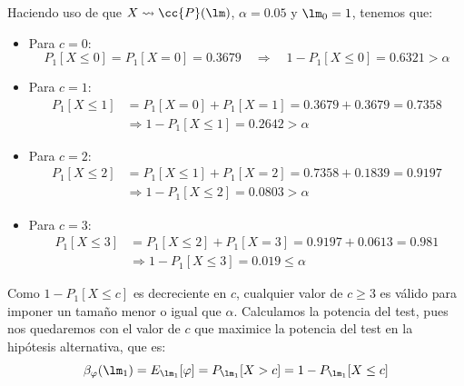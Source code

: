 \begin{ejercicio}
\begin{enumerate}[label=\alph*)]
            Haciendo uso de que $X\rightsquigarrow \cc{P}(\lm)$, $\alpha = 0.05$ y $\lm_0 = 1$, tenemos que:
            \begin{itemize}
                \item Para $c=0$:
                    \begin{equation*}
                        P_1[X\leq 0] = P_1[X = 0] = 0.3679 \quad\Longrightarrow\quad 1-P_1[X\leq 0] = 0.6321 > \alpha
                    \end{equation*}
                \item Para $c=1$:
                    \begin{align*}
                        P_1[X\leq 1] &= P_1[X=0] + P_1[X=1] = 0.3679 + 0.3679 = 0.7358  \\
                                     &\Longrightarrow 1-P_1[X\leq 1] = 0.2642 > \alpha
                    \end{align*}
                \item Para $c=2$:
                    \begin{align*}
                        P_1[X\leq 2] &= P_1[X\leq 1] + P_1[X=2] = 0.7358 + 0.1839 = 0.9197 \\
                                     &\Longrightarrow 1-P_1[X\leq 2] = 0.0803 > \alpha
                    \end{align*}
                \item Para $c=3$:
                    \begin{align*}
                        P_1[X\leq 3] &= P_1[X\leq 2] + P_1[X=3] = 0.9197 + 0.0613 = 0.981 \\
                                     &\Longrightarrow 1-P_1[X\leq 3] = 0.019 \leq \alpha
                    \end{align*}
            \end{itemize}

            Como $1-P_1[X\leq c]$ es decreciente en $c$, cualquier valor de $c\geq 3$ es válido para imponer un tamaño menor o igual que $\alpha$. Calculamos la potencia del test, pues nos quedaremos con el valor de $c$ que maximice la potencia del test en la hipótesis alternativa, que es:
            \begin{equation*}
                \beta_\varphi(\lm_1) = E_{\lm_1}[\varphi] = P_{\lm_1}[X>c] = 1-P_{\lm_1}[X\leq c]
            \end{equation*}


\end{enumerate}
\end{ejercicio}
